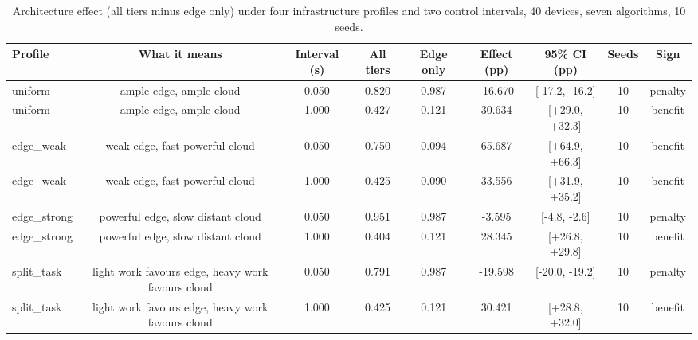 \begin{table}
\centering
\scriptsize
\caption{Architecture effect (all tiers minus edge only) under four infrastructure profiles and two control intervals, 40 devices, seven algorithms, 10 seeds.}
\label{tab:p1-heterogeneity}
\begin{tabular}{lcccccccc}
\toprule
Profile & What it means & Interval (s) & All tiers & Edge only & Effect (pp) & 95\% CI (pp) & Seeds & Sign \\
\midrule
uniform & ample edge, ample cloud & 0.050 & 0.820 & 0.987 & -16.670 & [-17.2, -16.2] & 10 & penalty \\
uniform & ample edge, ample cloud & 1.000 & 0.427 & 0.121 & 30.634 & [+29.0, +32.3] & 10 & benefit \\
edge\_weak & weak edge, fast powerful cloud & 0.050 & 0.750 & 0.094 & 65.687 & [+64.9, +66.3] & 10 & benefit \\
edge\_weak & weak edge, fast powerful cloud & 1.000 & 0.425 & 0.090 & 33.556 & [+31.9, +35.2] & 10 & benefit \\
edge\_strong & powerful edge, slow distant cloud & 0.050 & 0.951 & 0.987 & -3.595 & [-4.8, -2.6] & 10 & penalty \\
edge\_strong & powerful edge, slow distant cloud & 1.000 & 0.404 & 0.121 & 28.345 & [+26.8, +29.8] & 10 & benefit \\
split\_task & light work favours edge, heavy work favours cloud & 0.050 & 0.791 & 0.987 & -19.598 & [-20.0, -19.2] & 10 & penalty \\
split\_task & light work favours edge, heavy work favours cloud & 1.000 & 0.425 & 0.121 & 30.421 & [+28.8, +32.0] & 10 & benefit \\
\bottomrule
\end{tabular}
\par\vspace{2pt}{\footnotesize\raggedright A positive effect at the 1 s default with a negative effect at 50 ms under the same profile is the definition of a clock artefact: the topology did not change between the two rows. Confidence intervals resample seeds.\par}
\end{table}

